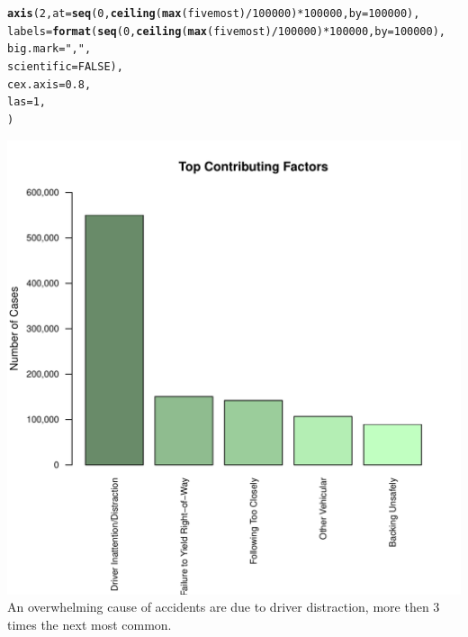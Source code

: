 \documentclass[10pt]{article}\usepackage[]{graphicx}\usepackage[]{xcolor}
\makeatletter
\def\maxwidth{ %
  \ifdim\Gin@nat@width>\linewidth
    \linewidth
  \else
    \Gin@nat@width
  \fi
}
\newcommand{\hlnum}[1]{\textcolor[rgb]{0.686,0.059,0.569}{#1}}%
\newcommand{\hlsng}[1]{\textcolor[rgb]{0.192,0.494,0.8}{#1}}%
\newcommand{\hlopt}[1]{\textcolor[rgb]{0,0,0}{#1}}%
\newcommand{\hldef}[1]{\textcolor[rgb]{0.345,0.345,0.345}{#1}}%
\newcommand{\hlkwc}[1]{\textcolor[rgb]{0.333,0.667,0.333}{#1}}%
\newcommand{\hlkwd}[1]{\textcolor[rgb]{0.737,0.353,0.396}{\textbf{#1}}}%
\newenvironment{kframe}{%
 \def\at@end@of@kframe{}%
 \ifinner\ifhmode%
  \def\at@end@of@kframe{\end{minipage}}%
  \begin{minipage}{\columnwidth}%
 \fi\fi%
 \def\FrameCommand##1{\hskip\@totalleftmargin \hskip-\fboxsep
 \colorbox{shadecolor}{##1}\hskip-\fboxsep
     \hskip-\linewidth \hskip-\@totalleftmargin \hskip\columnwidth}%
 \MakeFramed {\advance\hsize-\width
   \@totalleftmargin\z@ \linewidth\hsize
   \@setminipage}}%
 {\par\unskip\endMakeFramed%
 \at@end@of@kframe}
\newenvironment{knitrout}{}{} %
\makeatother
\begin{document}
\begin{knitrout}
\begin{kframe}
\begin{alltt}
\hlkwd{axis}\hldef{(}\hlnum{2}\hldef{,} \hlkwc{at} \hldef{=} \hlkwd{seq}\hldef{(}\hlnum{0}\hldef{,} \hlkwd{ceiling}\hldef{(}\hlkwd{max}\hldef{(fivemost)}\hlopt{/}\hlnum{100000}\hldef{)}\hlopt{*}\hlnum{100000}\hldef{,} \hlkwc{by} \hldef{=} \hlnum{100000}\hldef{),}
     \hlkwc{labels} \hldef{=} \hlkwd{format}\hldef{(}\hlkwd{seq}\hldef{(}\hlnum{0}\hldef{,} \hlkwd{ceiling}\hldef{(}\hlkwd{max}\hldef{(fivemost)}\hlopt{/}\hlnum{100000}\hldef{)}\hlopt{*}\hlnum{100000}\hldef{,} \hlkwc{by} \hldef{=} \hlnum{100000}\hldef{),}
                     \hlkwc{big.mark} \hldef{=} \hlsng{","}\hldef{,}
                     \hlkwc{scientific} \hldef{=} \hlnum{FALSE}\hldef{),}
     \hlkwc{cex.axis} \hldef{=} \hlnum{0.8}\hldef{,}
     \hlkwc{las} \hldef{=} \hlnum{1}\hldef{,}
     \hldef{)}
\end{alltt}
\end{kframe}
\includegraphics[width=\maxwidth]{figure/unnamed-chunk-4-1} 
\end{knitrout}
An overwhelming cause of accidents are due to driver distraction, more then 3 times the next most common.
\end{document}

